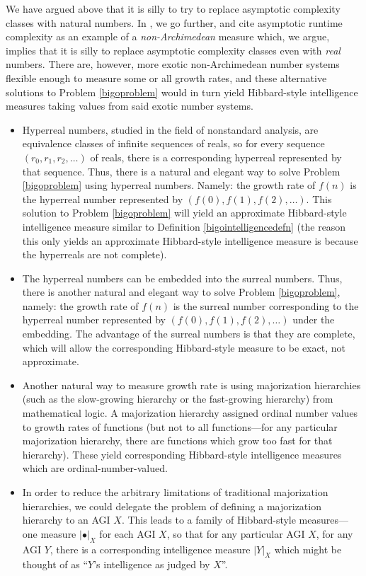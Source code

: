 \documentclass{article}
\begin{document}
We have argued above that it is silly to try to replace asymptotic complexity classes
with natural numbers. In \cite{alexander2020archimedean}, we go further, and cite
asymptotic runtime complexity as an example of a \emph{non-Archimedean} measure which,
we argue, implies that it is silly to replace asymptotic complexity classes
even with \emph{real} numbers. There are, however, more exotic non-Archimedean number systems
flexible enough to measure some or all growth rates, and these alternative solutions to
Problem \ref{bigoproblem} would in turn yield Hibbard-style intelligence measures taking
values from said exotic number systems.
\begin{itemize}
    \item
    Hyperreal numbers, studied in the field of nonstandard analysis,
    are equivalence classes of infinite sequences of reals,
    so for every sequence $(r_0,r_1,r_2,\ldots)$ of reals, there is a corresponding
    hyperreal represented by that sequence.
    Thus, there is a natural and elegant way to solve Problem \ref{bigoproblem}
    using hyperreal numbers. Namely: the growth rate of $f(n)$ is the hyperreal number
    represented by $(f(0),f(1),f(2),\ldots)$. This solution to Problem \ref{bigoproblem}
    will yield an approximate Hibbard-style intelligence measure similar to
    Definition \ref{bigointelligencedefn} (the reason this only yields an approximate
    Hibbard-style intelligence measure is because the hyperreals are not complete).
    \item
    The hyperreal numbers can be embedded into the surreal numbers.
    Thus, there is another natural and elegant way to solve Problem \ref{bigoproblem},
    namely: the growth rate of $f(n)$ is the surreal number corresponding to the
    hyperreal number represented by $(f(0),f(1),f(2),\ldots)$ under the embedding.
    The advantage of the surreal numbers is that they are complete, which will allow
    the corresponding Hibbard-style measure to be exact, not approximate.
    \item
    Another natural way to measure growth rate is using majorization hierarchies
    (such as the slow-growing hierarchy or the fast-growing hierarchy) from mathematical
    logic. A majorization hierarchy assigned ordinal number values to growth rates of
    functions (but not to all functions---for any particular majorization hierarchy, there
    are functions which grow too fast for that hierarchy). These yield corresponding
    Hibbard-style intelligence measures which are ordinal-number-valued.
    \item
    In order to reduce the arbitrary limitations of traditional majorization
    hierarchies, we could delegate the problem of defining a majorization hierarchy to
    an AGI $X$. This leads to a family of Hibbard-style measures---one measure
    $|\bullet|_X$ for each AGI $X$, so that for any particular AGI $X$, for any
    AGI $Y$, there is a corresponding intelligence measure $|Y|_X$ which might be
    thought of as ``$Y$'s intelligence as judged by $X$''.
\end{itemize}
\end{document}
